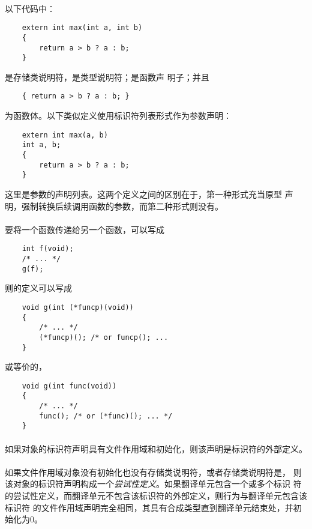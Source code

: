 {\paragraph{}
\ex 以下代码中：
\begin{lstlisting}
    extern int max(int a, int b)
    {
        return a > b ? a : b;
    }
\end{lstlisting}
是存储类说明符，是类型说明符；是函数声
明子；并且
\begin{lstlisting}
    { return a > b ? a : b; }
\end{lstlisting}
为函数体。以下类似定义使用标识符列表形式作为参数声明：
\begin{lstlisting}
    extern int max(a, b)
    int a, b;
    {
        return a > b ? a : b;
    }
\end{lstlisting}
这里是参数的声明列表。这两个定义之间的区别在于，第一种形式充当原型
声明，强制转换后续调用函数的参数，而第二种形式则没有。

\paragraph{}
\ex 要将一个函数传递给另一个函数，可以写成
\begin{lstlisting}
    int f(void);
    /* ... */
    g(f);
\end{lstlisting}
则的定义可以写成
\begin{lstlisting}
    void g(int (*funcp)(void))
    {
        /* ... */
        (*funcp)(); /* or funcp(); ...
    }
\end{lstlisting}
或等价的，
\begin{lstlisting}
    void g(int func(void))
    {
        /* ... */
        func(); /* or (*func)(); ... */
    }
\end{lstlisting}

\semantic
\paragraph{}
如果对象的标识符声明具有文件作用域和初始化，则该声明是标识符的外部定义。

\paragraph{}
如果文件作用域对象没有初始化也没有存储类说明符，或者存储类说明符是，
则该对象的标识符声明构成一个\textit{尝试性定义}。如果翻译单元包含一个或多个标识
符的尝试性定义，而翻译单元不包含该标识符的外部定义，则行为与翻译单元包含该标识符
的文件作用域声明完全相同，其具有合成类型直到翻译单元结束处，并初始化为0。

}
